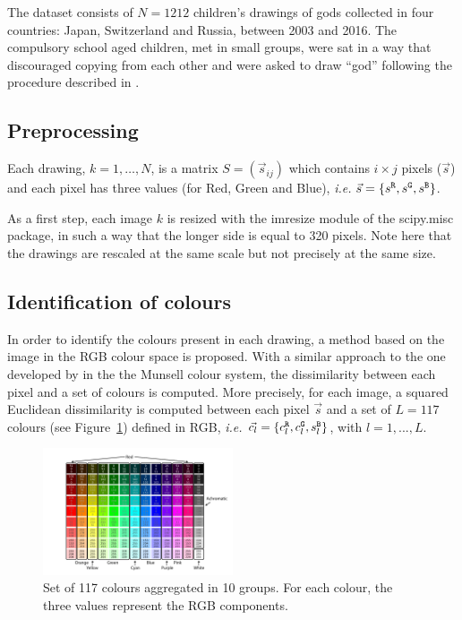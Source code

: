 \documentclass[11pt,a4paper]{article}
\begin{document}
The dataset consists of $N = 1212$ children's drawings of gods collected in four countries: Japan, Switzerland and Russia, between 2003 and 2016. The compulsory school aged children, met in small groups, were sat in a way that discouraged copying from each other and were asked to draw ``god'' following the procedure described in \citet{DandarovaRobertDessartSerbaevaEtAl2016}.


\subsection{Preprocessing}
Each drawing, $k = 1,\dots, N$, is a matrix $S = (\vec{s}_{ij})$ which contains $i \times j$
pixels ($\vec{s}$) and each pixel has three values (for Red, Green and Blue), \textit{i.e.}
$\vec{s} = \{ s^{\tt \scriptstyle R}, s^{\tt \scriptstyle G}, s^{\tt \scriptstyle B} \}$.

As a first step, each image $k$ is resized with the imresize
module of the scipy.misc package, in such a way that the longer side is
equal to 320 pixels. Note here that the drawings are
rescaled at the same scale but not precisely at the same size.


\subsection{Identification of colours}
\label{sec:identification}




In order to identify the colours present in each drawing, a method based on the image in the RGB colour space is
proposed. With a similar approach to the one developed by
\cite{kimbaelee2007} in the the Munsell colour system, the dissimilarity
between each pixel and a set of colours is computed. More precisely, for
each image, a squared Euclidean dissimilarity is computed between each
pixel \(\vec{s}\) and a set of $L = 117$ colours (see Figure~\ref{colour_set}) defined in RGB, \textit{i.e.}
\(\vec{c_l} = \{ c^{\tt \scriptstyle R}_{l}, c^{\tt \scriptstyle G}_{l}, s^{\tt \scriptstyle B}_{l} \}\),
with $l = 1, ..., L$.

\begin{figure}
	\centering
	\includegraphics[width=0.5\textwidth]{figures/Col_tab.pdf}
	\caption{Set of 117 colours aggregated in 10 groups. For each colour, the three values represent the RGB components. \label{colour_set}}
\end{figure}
\end{document}
